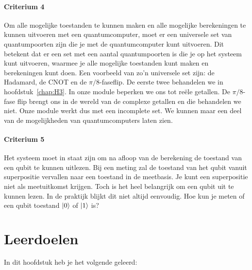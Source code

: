 \documentclass[../../main.tex]{subfiles}
\begin{document}
\paragraph*{Criterium 4}
Om alle mogelijke toestanden te kunnen maken en alle mogelijke berekeningen te kunnen uitvoeren met een quantumcomputer, moet er een universele set van quantumpoorten zijn die je met de quantumcomputer kunt uitvoeren. Dit betekent dat er een set met een aantal quantumpoorten is die je op het systeem kunt uitvoeren, waarmee je alle mogelijke toestanden kunt maken en berekeningen kunt doen. Een voorbeeld van zo'n universele set zijn: de Hadamard, de CNOT en de $\pi/8$-faseflip. De eerste twee behandelen we in hoofdstuk~\ref{chap:H3}. In onze module beperken we ons tot re\"ele getallen. De $\pi/8$-fase flip brengt ons in de wereld van de complexe getallen en die behandelen we niet. Onze module werkt dus met een incomplete set. We kunnen maar een deel van de mogelijkheden van quantumcomputers laten zien. 

\paragraph*{Criterium 5}
Het systeem moet in staat zijn om na afloop van de berekening de toestand van een qubit te kunnen uitlezen. Bij een meting zal de toestand van het qubit vanuit superpositie vervallen naar een toestand in de meetbasis. Je kunt een superpositie niet als meetuitkomst krijgen. Toch is het heel belangrijk om een qubit uit te kunnen lezen. In de praktijk blijkt dit niet altijd eenvoudig. Hoe kun je meten of een qubit toestand $\ket{0}$ of $\ket{1}$ is?

\section{Leerdoelen}
In dit hoofdstuk heb je het volgende geleerd:
\end{document}
